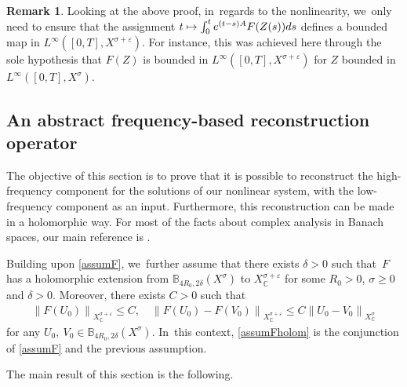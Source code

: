 \documentclass[10pt]{amsart}
\newcommand\mto{\mathchoice{\longmapsto}{\mapsto}{\mapsto}{\mapsto}}
\theoremstyle{definition}
\newtheorem{remark}[theorem]{Remark}
\let\veps\varepsilon
\newcommand\nor[2]{\left\|#1\right\|_{#2}}
\begin{document}
\begin{remark}\label{rk:abs-prop-reg}
Looking at the above proof, in~regards to the nonlinearity, we~only need to ensure that the assignment $t\mto \int_0^t e^{(t-s)A}F(Z(s))ds$ defines a bounded map in $L^\infty([0, T], X^{\sigma+\veps})$. For instance, this was achieved here through the sole hypothesis that $F(Z)$ is bounded in $L^\infty([0, T], X^{\sigma+\veps})$ for $Z$ bounded in $L^\infty([0, T], X^\sigma)$.
\end{remark}

\subsection{An abstract frequency-based reconstruction operator} The objective of this section is to prove that it is possible to reconstruct the high-frequency component for the solutions of our nonlinear system, with the low-frequency component as an input. Furthermore, this reconstruction can be made in a holomorphic way. For most of the facts about complex analysis in Banach spaces, our main reference is \cite{Muj86}.

Building upon \cref{assumF}, we~further assume that there exists $\delta>0$ such that~$F$ has a holomorphic extension from $\mathbb{B}_{4R_{0},2\delta}(X^{\sigma})$ to $X^{\sigma+\veps}_{\mathbb{C}}$ for some $R_{0}>0$, $\sigma\geq 0$ and $\delta>0$. Moreover, there exists $C>0$ such that
\begin{align}
\label{boundFanalytic}
\nor{F(U_{0})}{X^{\sigma+\veps}_{\mathbb{C}}}\leq C,\quad \nor{F(U_{0})-F(V_{0})}{X^{\sigma+\veps}_{\mathbb{C}}}\leq C \nor{U_{0}-V_{0}}{X^{\sigma}_{\mathbb{C}}}
\end{align}
for any $U_{0},~V_{0}\in \mathbb{B}_{4R_{0},2\delta}(X^{\sigma})$. In~this context, \cref{assumFholom} is the conjunction of \cref{assumF} and the previous assumption.

The main result of this section is the following.
\end{document}
